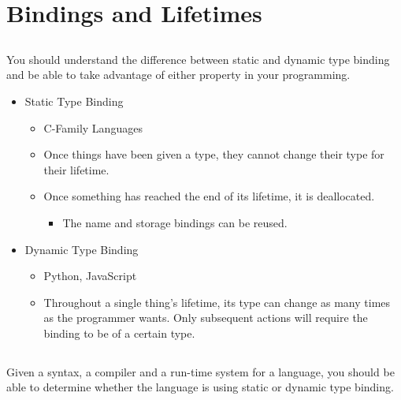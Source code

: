 \section{Bindings and Lifetimes}\label{sec:Bindings_Lifetimes}

\subsection{}
You should understand the difference between static and dynamic type binding and be able to take advantage of either property in your programming.

\begin{itemize}
\item Static Type Binding
  \begin{itemize}[noitemsep]
  \item C-Family Languages
  \item Once things have been given a type, they cannot change their type for their lifetime.
  \item Once something has reached the end of its lifetime, it is deallocated.
    \begin{itemize}[noitemsep]
    \item The name and storage bindings can be reused.
    \end{itemize}
  \end{itemize}

\item Dynamic Type Binding
  \begin{itemize}[noitemsep]
  \item Python, JavaScript
  \item Throughout a single thing's lifetime, its type can change as many times as the programmer wants. Only subsequent actions will require the binding to be of a certain type.
  \end{itemize}
\end{itemize}

\subsection{}
Given a syntax, a compiler and a run-time system for a language, you should be able to determine whether the language is using static or dynamic type binding.

